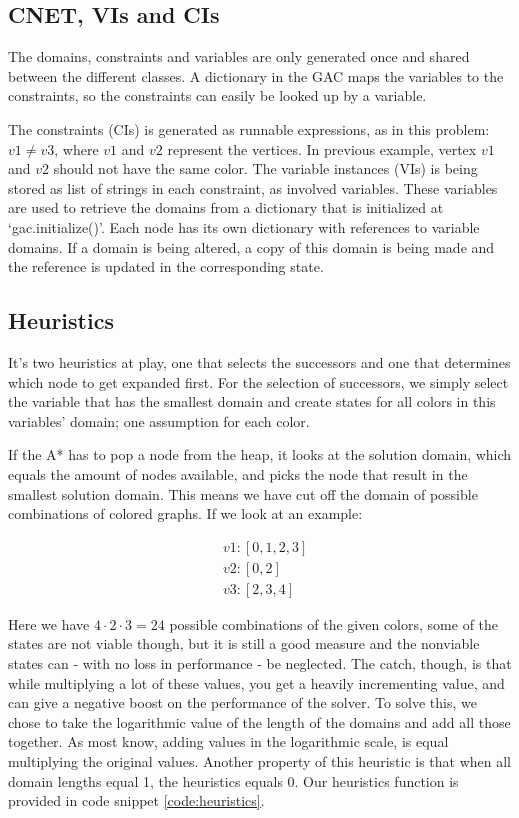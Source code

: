 

\subsection{CNET, VIs and CIs}
The domains, constraints and variables are only generated once and shared between the different classes. A dictionary in the GAC maps the variables to the constraints, so the constraints can easily be looked up by a variable.

The constraints (CIs) is generated as runnable expressions, as in this problem: \( v1 \neq v3 \), where \(v1\) and \(v2\) represent the vertices. In previous example, vertex \(v1\) and \(v2\) should not have the same color. The variable instances (VIs) is being stored as list of strings in each constraint, as involved variables. These variables are used to retrieve the domains from a dictionary that is initialized at `gac.initialize()'. Each node has its own dictionary with references to variable domains. If a domain is being altered, a copy of this domain is being made and the reference is updated in the corresponding state.

\subsection*{Heuristics}
It's two heuristics at play, one that selects the successors and one that determines which node to get expanded first. For the selection of successors, we simply select the variable that has the smallest domain and create states for all colors in this variables' domain; one assumption for each color.

If the A* has to pop a node from the heap, it looks at the solution domain, which equals the amount of nodes available, and picks the node that result in the smallest solution domain. This means we have cut off the domain of possible combinations of colored graphs. If we look at an example:

\begin{align*}
	&v1: [0,1,2,3]\\
	&v2: [0,2]\\
	&v3: [2,3,4]
\end{align*}

Here we have \(4 \cdot 2 \cdot 3 = 24\) possible combinations of the given colors, some of the states are not viable though, but it is still a good measure and the nonviable states can - with no loss in performance - be neglected. The catch, though, is that while multiplying a lot of these values, you get a heavily incrementing value, and can give a negative boost on the performance of the solver. To solve this, we chose to take the logarithmic value of the length of the domains and add all those together. As most know, adding values in the logarithmic scale, is equal multiplying the original values. Another property of this heuristic is that when all domain lengths equal 1, the heuristics equals 0. Our heuristics function is provided in code snippet \ref{code:heuristics}.

